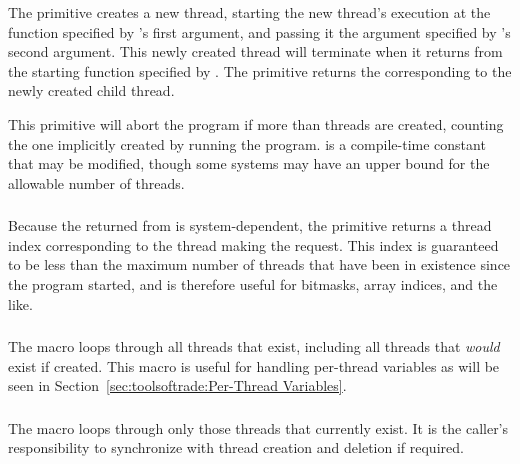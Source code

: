 The  primitive creates a new thread,
starting the new thread's execution
at the function  specified by 's
first argument, and passing it the argument specified by
's second argument.
This newly created thread will terminate when it returns from the
starting function specified by .
The  primitive returns the 
corresponding to the newly created child thread.

This primitive will abort the program if more than 
threads are created, counting the one implicitly created by running
the program.
 is a compile-time constant that may be modified,
though some systems may have an upper bound for the allowable number
of threads.

\subsubsection{}

Because the  returned from  is
system-dependent, the  primitive returns a thread
index corresponding to the thread making the request.
This index is guaranteed to be less than the maximum number of threads
that have been in existence since the program started,
and is therefore useful for bitmasks, array indices, and
the like.

\subsubsection{}

The  macro loops through all threads that exist,
including all threads that \emph{would} exist if created.
This macro is useful for handling per-thread variables as will be
seen in Section~\ref{sec:toolsoftrade:Per-Thread Variables}.

\subsubsection{}

The 
macro loops through only those threads that currently exist.
It is the caller's responsibility to synchronize with thread
creation and deletion if required.

\subsubsection{}

